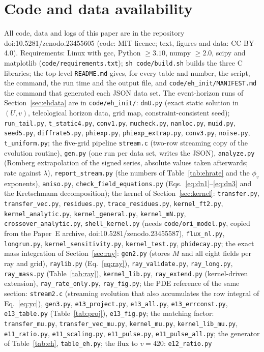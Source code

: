 \documentclass[11pt]{article}
\begin{document}
\section*{Code and data availability}
\raggedright
All code, data and logs of this paper are in the repository doi:10.5281/zenodo.23455605 (code: MIT licence; text, figures and data: CC-BY-4.0). Requirements: Linux with gcc, Python $\ge3.10$, numpy $\ge2.0$, scipy and matplotlib (\texttt{code/requirements.txt}); \texttt{sh code/build.sh} builds the three C libraries; the top-level \texttt{README.md} gives, for every table and number, the script, the command, the run time and the output file, and \texttt{code/eh\_init/MANIFEST.md} the command that generated each JSON data set. The event-horizon runs of Section~\ref{sec:ehdata} are in \texttt{code/eh\_init/}: \texttt{dnU.py} (exact static solution in $(U,v)$, teleological horizon data, grid map, constraint-consistent seed); \texttt{run\_tail.py}, \texttt{t\_static4.py}, \texttt{conv1.py}, \texttt{mucheck.py}, \texttt{nanloc.py}, \texttt{muid.py}, \texttt{seed5.py}, \texttt{diffrate5.py}, \texttt{phiexp.py}, \texttt{phiexp\_extrap.py}, \texttt{conv3.py}, \texttt{noise.py}, \texttt{t\_uniform.py}; the five-grid pipeline \texttt{stream.c} (two-row streaming copy of the evolution routine), \texttt{gen.py} (one run per data set, writes the JSON), \texttt{analyze.py} (Romberg extrapolation of the signed series, absolute values taken afterwards; rate against $\lambda$), \texttt{report\_stream.py} (the numbers of Table~\ref{tab:ehrate} and the $\phi_v$ exponents), \texttt{aniso.py}, \texttt{check\_field\_equations.py} (Eqs.~\eqref{eq:dn1}--\eqref{eq:dn3} and the Kretschmann decomposition); the kernel of Section~\ref{sec:kernel}: \texttt{transfer.py}, \texttt{transfer\_vec.py}, \texttt{residues.py}, \texttt{trace\_residues.py}, \texttt{kernel\_ft2.py}, \texttt{kernel\_analytic.py}, \texttt{kernel\_general.py}, \texttt{kernel\_mN.py}, \texttt{crossover\_analytic.py}, \texttt{shell\_kernel.py} (needs \texttt{code/ori\_model.py}, copied from the Paper~E archive, doi:10.5281/zenodo.23455587), \texttt{flux\_nl.py}, \texttt{longrun.py}, \texttt{kernel\_sensitivity.py}, \texttt{kernel\_test.py}, \texttt{phidecay.py}; the exact mass integration of Section~\ref{sec:ray}: \texttt{gen2.py} (stores $M$ and all eight fields per ray and grid), \texttt{raylib.py} (Eq.~\eqref{eq:ray}), \texttt{ray\_validate.py}, \texttt{ray\_long.py}, \texttt{ray\_mass.py} (Table~\ref{tab:ray}), \texttt{kernel\_lib.py}, \texttt{ray\_extend.py} (kernel-driven extension), \texttt{ray\_rate\_only.py}, \texttt{ray\_fig.py}; the PDE reference of the same section: \texttt{stream2.c} (streaming evolution that also accumulates the row integral of Eq.~\eqref{eq:yc}), \texttt{gen3.py}, \texttt{e13\_project.py}, \texttt{e13\_all.py}, \texttt{e13\_errconst.py}, \texttt{e13\_table.py} (Table~\ref{tab:proj}), \texttt{e13\_fig.py}; the matching factor: \texttt{transfer\_mu.py}, \texttt{transfer\_vec\_mu.py}, \texttt{kernel\_mu.py}, \texttt{kernel\_lib\_mu.py}, \texttt{e11\_ratio.py}, \texttt{e11\_scaling.py}, \texttt{e11\_pulse.py}, \texttt{e11\_pulse\_all.py}; the generator of Table~\ref{tab:eh}, \texttt{table\_eh.py}; the flux to $v=420$: \texttt{e12\_ratio.py} 
\end{document}
